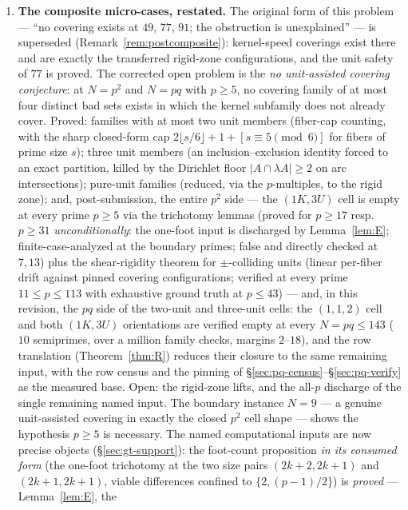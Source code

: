 \begin{enumerate}[leftmargin=1.7em,itemsep=4pt]
\item \textbf{The composite micro-cases, restated.} The original form of
  this problem --- ``no covering exists at $49$, $77$, $91$; the
  obstruction is unexplained'' --- is superseded
  (Remark~\ref{rem:postcomposite}): kernel-speed coverings exist there and
  are exactly the transferred rigid-zone configurations, and the unit
  safety of $77$ is proved. The corrected open problem is the \emph{no
  unit-assisted covering conjecture}: at $N=p^2$ and $N=pq$ with $p\ge5$,
  no covering family of at most four distinct bad sets exists in which the
  kernel subfamily does not already cover. Proved: families with at most
  two unit members (fiber-cap counting, with the sharp closed-form cap
  $2\lfloor s/6\rfloor+1+[s\equiv5\pmod6]$ for fibers of prime size $s$);
  three unit members (an inclusion--exclusion identity forced to an exact
  partition, killed by the Dirichlet floor $|A\cap\lambda A|\ge2$ on arc
  intersections); pure-unit families (reduced, via the $p$-multiples,
  to the rigid zone); and, post-submission, the entire $p^2$ side --- the
  $(1K,3U)$ cell is empty at every prime $p\ge5$ via the trichotomy
  lemmas (proved for $p\ge17$ resp.\ $p\ge31$ \emph{unconditionally}: the
  one-foot input is discharged by Lemma~\ref{lem:E}; finite-case-analyzed
  at the boundary primes; false and directly checked at $7,13$) plus the
  shear-rigidity theorem for $\pm$-colliding units
  (linear per-fiber drift against pinned covering configurations;
  verified at every prime $11\le p\le113$ with exhaustive ground truth at $p\le43$) --- and, in this revision, the $pq$ side of
  the two-unit and three-unit cells: the $(1,1,2)$ cell and both
  $(1K,3U)$ orientations are verified empty at every $N=pq\le143$ ($10$
  semiprimes, over a million family checks, margins $2$--$18$), and the
  row translation (Theorem~\ref{thm:R}) reduces their closure to the same
  remaining input, with the row census and the pinning of
  \S\ref{sec:pq-census}--\S\ref{sec:pq-verify} as the measured base.
  Open: the rigid-zone lifts, and the all-$p$ discharge of the single
  remaining named input. The boundary
  instance $N=9$ --- a genuine unit-assisted covering in exactly the
  closed $p^2$ cell shape --- shows the hypothesis $p\ge5$ is necessary.
  The named computational inputs are now precise
  objects (\S\ref{sec:gt-support}): the foot-count proposition \emph{in
  its consumed form} (the one-foot trichotomy at the two size pairs
  $(2k{+}2,2k{+}1)$ and $(2k{+}1,2k{+}1)$, viable differences confined to
  $\{2,(p-1)/2\}$) is \emph{proved} --- Lemma~\ref{lem:E}, the

\end{enumerate}
